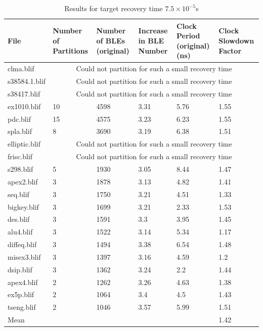 \documentclass[12pt,final,oneside]{dwThesis} %
\begin{document}
      \begin{table}
      \footnotesize
      \begin{adjustwidth}{-1cm}{-1.2cm}
         \begin{tabularx}{1.1\textwidth}{XXXXXX}
            \toprule
            File & Number of Partitions &  Number of BLEs (original) &  Increase in BLE Number &  Clock Period (original) (ns) &  Clock Slowdown Factor\\
            \midrule
clma.blif      &  \multicolumn{5}{c}{Could not partition for such a small recovery time}\\
s38584.1.blif  &   \multicolumn{5}{c}{Could not partition for such a small recovery time}\\
s38417.blif    &   \multicolumn{5}{c}{Could not partition for such a small recovery time}\\
ex1010.blif    & 10 & 4598 & 3.31 & 5.76 & 1.55\\
pdc.blif       & 15 & 4575 & 3.23 & 6.23 & 1.55\\
spla.blif      & 8 & 3690 & 3.19 & 6.38 & 1.51\\
elliptic.blif  &  \multicolumn{5}{c}{Could not partition for such a small recovery time}\\
frisc.blif &   \multicolumn{5}{c}{Could not partition for such a small recovery time}\\
s298.blif      & 5 & 1930 & 3.05 & 8.44 & 1.47\\
apex2.blif     & 3 & 1878 & 3.13 & 4.82 & 1.41\\
seq.blif       & 3 & 1750 & 3.21 & 4.51 & 1.33\\
bigkey.blif    & 3 & 1699 & 3.21 & 2.33 & 1.53\\
des.blif       & 3 & 1591 & 3.3 & 3.95 & 1.45\\
alu4.blif      & 3 & 1522 & 3.14 & 5.34 & 1.17\\
diffeq.blif    & 3 & 1494 & 3.38 & 6.54 & 1.48\\
misex3.blif    & 3 & 1397 & 3.16 & 4.59 & 1.2\\
dsip.blif      & 3 & 1362 & 3.24 & 2.2 & 1.44\\
apex4.blif     & 2 & 1262 & 3.26 & 4.63 & 1.38\\
ex5p.blif      & 2 & 1064 & 3.4 & 4.5 & 1.43\\
tseng.blif     & 2 & 1046 & 3.57 & 5.99 & 1.51\\
Mean &         &           &        &          & 1.42\\

\bottomrule
         \end{tabularx}
         \caption{Results for target recovery time $7.5\times10^{-5}$s}
         \label{Results7.5e-5}
      \end{adjustwidth}
   \end{table}
   
\end{document}

